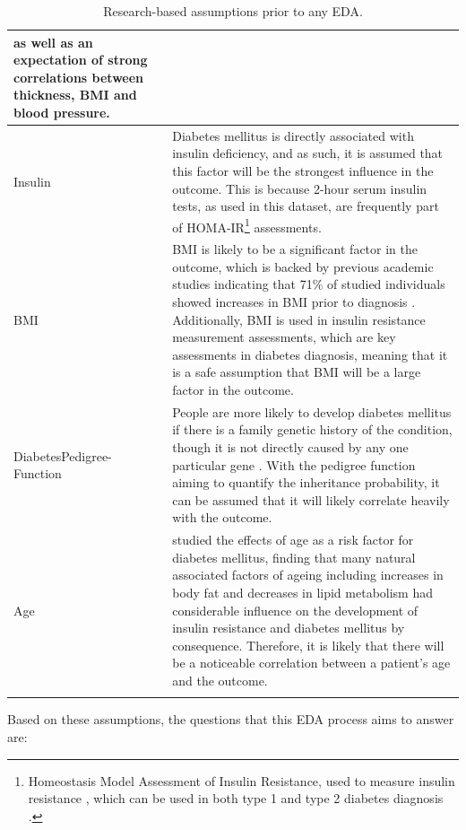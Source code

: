 \documentclass[12pt]{report}
\newcommand{\para}{\vspace{8pt}\noindent}
\begin{document}
\begin{longtable}{ | p{} | p{} | }
    as well as an expectation of strong correlations between thickness, BMI and blood pressure.\\
    \hline
    Insulin & Diabetes mellitus is directly associated with insulin deficiency, and as such, it is assumed that this factor will be 
    the strongest influence in the outcome. This is because 2-hour serum insulin tests, as used in this dataset, are frequently 
    part of HOMA-IR\footnote{Homeostasis Model Assessment of Insulin Resistance, used to measure insulin resistance \autocite{tahapary_challenges_2022}, which can be used in both type 1 and type 2 diabetes diagnosis \autocite{khalili_are_2023}.}
    assessments. \\
    \hline
    BMI & BMI is likely to be a significant factor in the outcome, which is backed by previous academic studies indicating that 71\% 
    of studied individuals showed increases in BMI prior to diagnosis \autocite{donnelly_trajectories_2024}. Additionally, BMI is used in insulin resistance measurement assessments,
    which are key assessments in diabetes diagnosis, meaning that it is a safe assumption that BMI will be a large factor in the outcome. \\
    \hline
    DiabetesPedigree- Function & People are more likely to develop diabetes mellitus if there is a family genetic history of the condition, though it is not 
    directly caused by any one particular gene \autocite{diabetes_uk_what_nodate}. With the pedigree function aiming 
    to quantify the inheritance probability, it can be assumed that it will likely correlate heavily with the outcome. \\
    \hline
    Age & \textcite{chackrewarthy_age_2012} studied the effects of age as a risk factor for diabetes mellitus, finding that many natural associated 
    factors of ageing including increases in body fat and decreases in lipid metabolism had considerable influence on the development of insulin 
    resistance and diabetes mellitus by consequence. Therefore, it is likely that there will be a noticeable correlation between a patient's age 
    and the outcome. 
     \\
    \hline
    \caption{Research-based assumptions prior to any EDA.}\label{tab:Assumptions}
\end{longtable}

\para Based on these assumptions, the questions that this EDA process aims to answer are:
\end{document}
